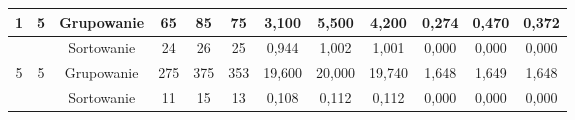 \documentclass[licencjacka]{pracamgr}
\begin{document}
\begin{table}[H]
{\begin{tabular}{@{}cccccccccccc@{}}
1                                                               & 5                                                       & Grupowanie & 65                                                      & 85                                                      & 75                                                         & 3,100                                                      & 5,500                                                      & 4,200                                                          & 0,274                                                              & 0,470                                                               & 0,372                                                                  \\ \midrule
                                                                &                                                         & Sortowanie & 24                                                      & 26                                                      & 25                                                         & 0,944                                                      & 1,002                                                      & 1,001                                                          & 0,000                                                              & 0,000                                                               & 0,000                                                                  \\
5                                                               & 5                                                       & Grupowanie & 275                                                     & 375                                                     & 353                                                        & 19,600                                                     & 20,000                                                     & 19,740                                                         & 1,648                                                              & 1,649                                                               & 1,648                                                                  \\ \midrule
                                                                &                                                         & Sortowanie & 11                                                      & 15                                                      & 13                                                         & 0,108                                                      & 0,112                                                      & 0,112                                                          & 0,000                                                              & 0,000                                                               & 0,000                                                                  \\

\end{tabular}}
\end{table}
\end{document}
